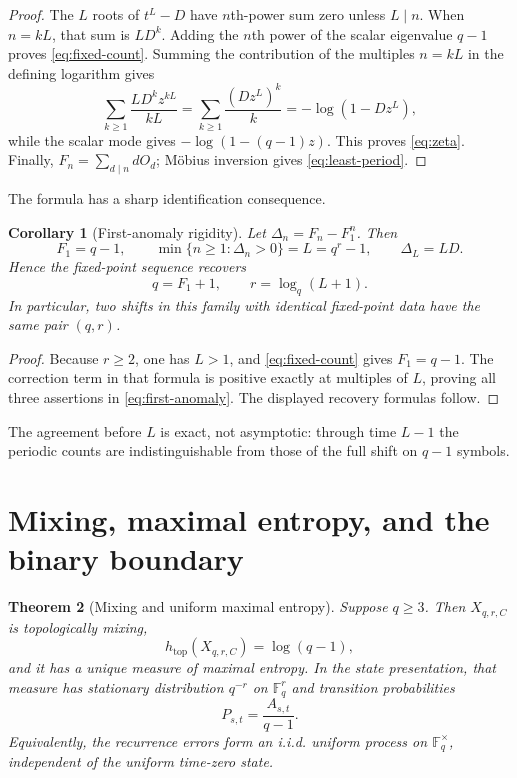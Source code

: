 \documentclass[11pt,a4paper]{amsart}
\newtheorem{theorem}{Theorem}[section]
\newtheorem{corollary}[theorem]{Corollary}
\theoremstyle{definition}
\theoremstyle{remark}
\newcommand{\F}{\mathbb F}
\newcommand{\htop}{h_{\mathrm{top}}}
\begin{document}
\begin{proof}
The $L$ roots of $t^L-D$ have $n$th-power sum zero unless $L\mid n$.
When $n=kL$, that sum is $LD^k$.  Adding the $n$th power of the scalar
eigenvalue $q-1$ proves \eqref{eq:fixed-count}.  Summing the contribution of
the multiples $n=kL$ in the defining logarithm gives
\[
 \sum_{k\geq1}\frac{LD^kz^{kL}}{kL}
 =\sum_{k\geq1}\frac{(Dz^L)^k}{k}
 =-\log(1-Dz^L),
\]
while the scalar mode gives $-\log(1-(q-1)z)$.  This proves
\eqref{eq:zeta}.  Finally, $F_n=\sum_{d\mid n}dO_d$; M\"obius inversion gives
\eqref{eq:least-period}.
\end{proof}

The formula has a sharp identification consequence.

\begin{corollary}[First-anomaly rigidity]
\label{cor:recovery}
Let $\Delta_n=F_n-F_1^n$.  Then
\begin{equation}\label{eq:first-anomaly}
 F_1=q-1,
 \qquad
 \min\{n\geq1:\Delta_n>0\}=L=q^r-1,
 \qquad
 \Delta_L=LD.
\end{equation}
Hence the fixed-point sequence recovers
\[
 q=F_1+1,
 \qquad
 r=\log_q(L+1).
\]
In particular, two shifts in this family with identical fixed-point data
have the same pair $(q,r)$.
\end{corollary}

\begin{proof}
Because $r\geq2$, one has $L>1$, and \eqref{eq:fixed-count} gives
$F_1=q-1$.  The correction term in that formula is positive exactly at
multiples of $L$, proving all three assertions in \eqref{eq:first-anomaly}.
The displayed recovery formulas follow.
\end{proof}

The agreement before $L$ is exact, not asymptotic: through time $L-1$ the
periodic counts are indistinguishable from those of the full shift on
$q-1$ symbols.

\section{Mixing, maximal entropy, and the binary boundary}
\label{sec:mixing}

\begin{theorem}[Mixing and uniform maximal entropy]
\label{thm:mixing}
Suppose $q\geq3$.  Then $X_{q,r,C}$ is topologically mixing,
\begin{equation}\label{eq:entropy}
 \htop(X_{q,r,C})=\log(q-1),
\end{equation}
and it has a unique measure of maximal entropy.  In the state presentation,
that measure has stationary distribution $q^{-r}$ on $\F_q^r$ and transition
probabilities
\begin{equation}\label{eq:parry}
 P_{s,t}=\frac{A_{s,t}}{q-1}.
\end{equation}
Equivalently, the recurrence errors form an i.i.d. uniform process on
$\F_q^\times$, independent of the uniform time-zero state.
\end{theorem}
\end{document}
